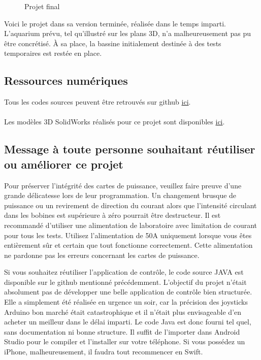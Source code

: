 \documentclass{article}
\begin{document}
\begin{figure}[H]
\begin{minipage}{0.32\textwidth}
    \end{minipage}
    \caption{Projet final}
    \label{fig:assemblage3}
\end{figure}
\noindent
Voici le projet dans sa version terminée, réalisée dans le temps imparti. L'aquarium prévu, tel qu'illustré sur les plans 3D, n'a malheureusement pas pu être concrétisé. À sa place, la bassine initialement destinée à des tests temporaires est restée en place.

\subsection{Ressources numériques}
Tous les codes sources peuvent être retrouvés sur github \href{https://github.com/JeanLeBris/Drone_Magnetic_Telepropulsion}{ici}.
\\\\
Les modèles 3D SolidWorks réalisés pour ce projet sont disponibles \href{https://grabcad.com/library/tele-propulsion-et-telecommande-magnetique-de-drones-de-surface-1}{ici}.

\subsection*{Message à toute personne souhaitant réutiliser ou améliorer ce projet}
Pour préserver l'intégrité des cartes de puissance, veuillez faire preuve d'une grande délicatesse lors de leur programmation. Un changement brusque de puissance ou un revirement de direction du courant alors que l'intensité circulant dans les bobines est supérieure à zéro pourrait être destructeur. Il est recommandé d'utiliser une alimentation de laboratoire avec limitation de courant pour tous les tests. Utilisez l'alimentation de 50A uniquement lorsque vous êtes entièrement sûr et certain que tout fonctionne correctement. Cette alimentation ne pardonne pas les erreurs concernant les cartes de puissance.

Si vous souhaitez réutiliser l'application de contrôle, le code source JAVA est disponible sur le github mentionné précédemment. L'objectif du projet n'était absolument pas de développer une belle application de contrôle bien structurée. Elle a simplement été réalisée en urgence un soir, car la précision des joysticks Arduino bon marché était catastrophique et il n'était plus envisageable d'en acheter un meilleur dans le délai imparti. Le code Java est donc fourni tel quel, sans documentation ni bonne structure. Il suffit de l'importer dans Android Studio pour le compiler et l'installer sur votre téléphone. Si vous possédez un iPhone, malheureusement, il faudra tout recommencer en Swift.
\end{document}
